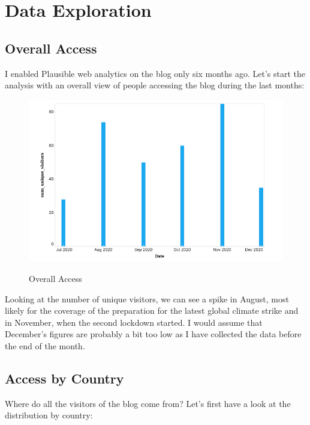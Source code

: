 %
%

\pagebreak
\section{Data Exploration}

\onehalfspacing

\subsection{Overall Access}

I enabled Plausible web analytics on the blog only six months ago. Let's start the analysis with an overall view of people accessing the blog during the last months:

\begin{figure}[H]
\centering
\caption {Overall Access}
\includegraphics[width=\linewidth]{images/access-overall.png}
\label{fig:accessOverall}
\end{figure}

Looking at the number of unique visitors, we can see a spike in August, most likely for the coverage of the preparation for the latest global climate strike and in November, when the second lockdown started. I would assume that December's figures are probably a bit too low as I have collected the data before the end of the month.

\subsection{Access by Country}

Where do all the visitors of the blog come from? Let's first have a look at the distribution by country:

